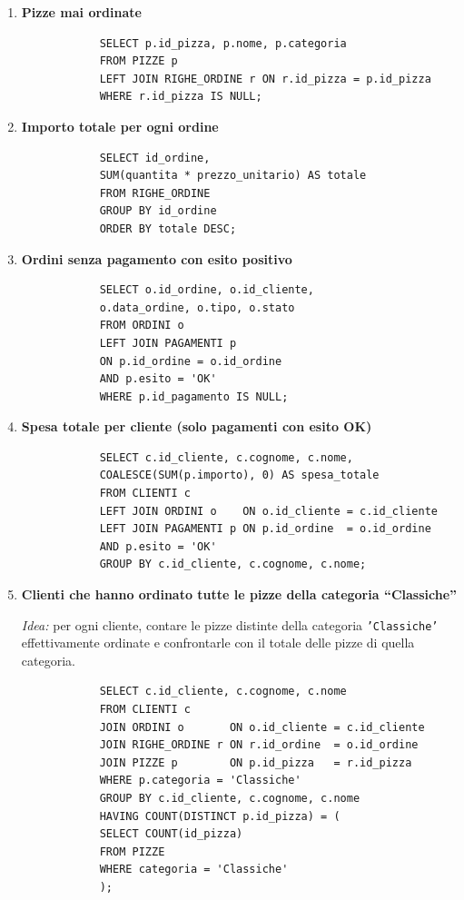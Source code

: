 \documentclass[a4paper,12pt]{article}
\begin{document}
\begin{enumerate}
		\item \textbf{Pizze mai ordinate}
		\begin{lstlisting}
			SELECT p.id_pizza, p.nome, p.categoria
			FROM PIZZE p
			LEFT JOIN RIGHE_ORDINE r ON r.id_pizza = p.id_pizza
			WHERE r.id_pizza IS NULL;
		\end{lstlisting}
		
		\item \textbf{Importo totale per ogni ordine}
		\begin{lstlisting}
			SELECT id_ordine,
			SUM(quantita * prezzo_unitario) AS totale
			FROM RIGHE_ORDINE
			GROUP BY id_ordine
			ORDER BY totale DESC;
		\end{lstlisting}
		
		\item \textbf{Ordini senza pagamento con esito positivo}
		\begin{lstlisting}
			SELECT o.id_ordine, o.id_cliente,
			o.data_ordine, o.tipo, o.stato
			FROM ORDINI o
			LEFT JOIN PAGAMENTI p
			ON p.id_ordine = o.id_ordine
			AND p.esito = 'OK'
			WHERE p.id_pagamento IS NULL;
		\end{lstlisting}
		
		\item \textbf{Spesa totale per cliente (solo pagamenti con esito OK)}
		\begin{lstlisting}
			SELECT c.id_cliente, c.cognome, c.nome,
			COALESCE(SUM(p.importo), 0) AS spesa_totale
			FROM CLIENTI c
			LEFT JOIN ORDINI o    ON o.id_cliente = c.id_cliente
			LEFT JOIN PAGAMENTI p ON p.id_ordine  = o.id_ordine
			AND p.esito = 'OK'
			GROUP BY c.id_cliente, c.cognome, c.nome;
		\end{lstlisting}
		
		\item \textbf{Clienti che hanno ordinato tutte le pizze della categoria ``Classiche''}
		
		\textit{Idea:} per ogni cliente, contare le pizze distinte della categoria \texttt{'Classiche'} effettivamente ordinate e confrontarle con il totale delle pizze di quella categoria.
		\begin{lstlisting}
			SELECT c.id_cliente, c.cognome, c.nome
			FROM CLIENTI c
			JOIN ORDINI o       ON o.id_cliente = c.id_cliente
			JOIN RIGHE_ORDINE r ON r.id_ordine  = o.id_ordine
			JOIN PIZZE p        ON p.id_pizza   = r.id_pizza
			WHERE p.categoria = 'Classiche'
			GROUP BY c.id_cliente, c.cognome, c.nome
			HAVING COUNT(DISTINCT p.id_pizza) = (
			SELECT COUNT(id_pizza)
			FROM PIZZE
			WHERE categoria = 'Classiche'
			);
		\end{lstlisting}
		
	\end{enumerate}
	
\end{document}
